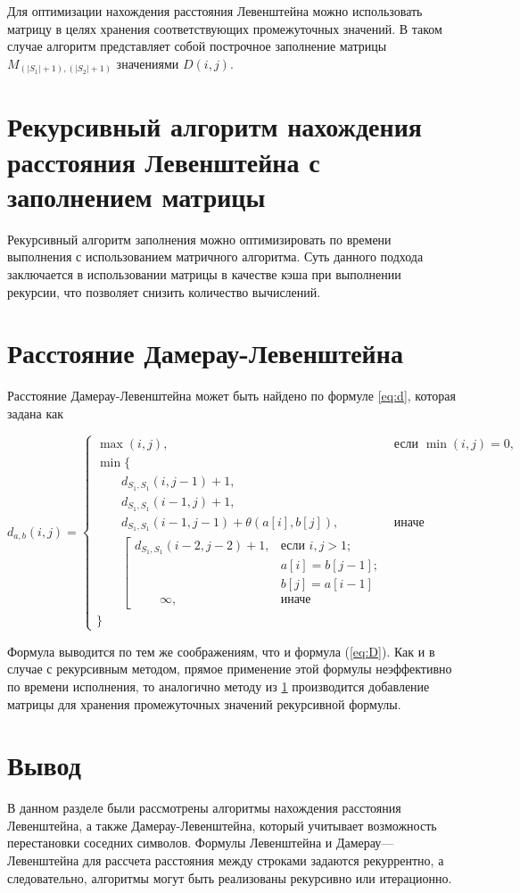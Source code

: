 Для оптимизации нахождения расстояния Левенштейна можно использовать матрицу в целях хранения соответствующих промежуточных значений. В таком случае алгоритм представляет собой построчное заполнение матрицы $M_{(|S_1|+1), (|S_2|+1)}$ значениями $D(i, j)$.


\section{Рекурсивный алгоритм нахождения расстояния Левенштейна с заполнением матрицы}

\label{sec:recmat}


Рекурсивный алгоритм заполнения можно оптимизировать по времени выполнения с использованием матричного алгоритма. Суть данного подхода заключается в использовании матрицы в качестве кэша при выполнении рекурсии, что позволяет снизить количество вычислений.


\section{Расстояние Дамерау-Левенштейна}

Расстояние Дамерау-Левенштейна может быть найдено по формуле \ref{eq:d}, которая задана как

\begin{equation}
\label{eq:d}
d_{a,b}(i, j) = \begin{cases}
\max(i, j), &\text{если }\min(i, j) = 0,\\
\min \lbrace \\
\qquad d_{S_1,S_1}(i, j-1) + 1,\\
\qquad d_{S_1,S_1}(i-1, j) + 1,\\
\qquad d_{S_1,S_1}(i-1, j-1) + \theta(a[i], b[j]), &\text{иначе}\\
\qquad \left[ \begin{array}{cc}d_{S_1,S_1}(i-2, j-2) + 1, &\text{если }i,j > 1;\\
\qquad &\text{}a[i] = b[j-1]; \\
\qquad &\text{}b[j] = a[i-1]\\
\qquad \infty, & \text{иначе}\end{array}\right.\\
\rbrace
\end{cases}
\end{equation}

Формула выводится по тем же соображениям, что и формула (\ref{eq:D}).
Как и в случае с рекурсивным методом, прямое применение этой формулы неэффективно по времени исполнения, то аналогично методу из \ref{sec:recmat} производится добавление матрицы для хранения промежуточных значений рекурсивной формулы.

\section{Вывод}
	В данном разделе были рассмотрены алгоритмы нахождения расстояния Левенштейна, а также Дамерау-Левенштейна, который учитывает возможность перестановки соседних символов. Формулы Левенштейна и Дамерау—Левенштейна для рассчета расстояния между строками задаются рекуррентно, а следовательно, алгоритмы могут быть реализованы рекурсивно или итерационно.
	
\clearpage
